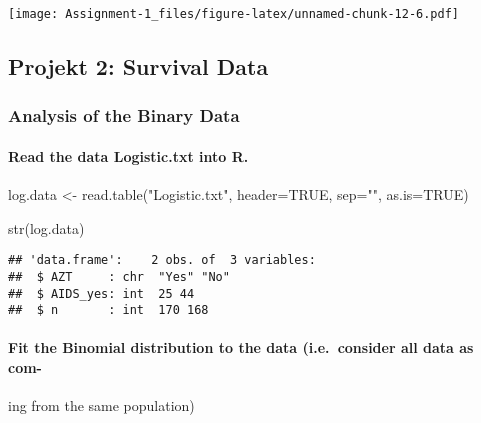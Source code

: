 \documentclass[
]{article}
\newenvironment{Shaded}{\begin{snugshade}}{\end{snugshade}}
\newcommand{\AttributeTok}[1]{\textcolor[rgb]{0.77,0.63,0.00}{#1}}
\newcommand{\CommentTok}[1]{\textcolor[rgb]{0.56,0.35,0.01}{\textit{#1}}}
\newcommand{\ConstantTok}[1]{\textcolor[rgb]{0.00,0.00,0.00}{#1}}
\newcommand{\FloatTok}[1]{\textcolor[rgb]{0.00,0.00,0.81}{#1}}
\newcommand{\FunctionTok}[1]{\textcolor[rgb]{0.00,0.00,0.00}{#1}}
\newcommand{\NormalTok}[1]{#1}
\newcommand{\OtherTok}[1]{\textcolor[rgb]{0.56,0.35,0.01}{#1}}
\newcommand{\SpecialCharTok}[1]{\textcolor[rgb]{0.00,0.00,0.00}{#1}}
\newcommand{\StringTok}[1]{\textcolor[rgb]{0.31,0.60,0.02}{#1}}
\begin{document}
\texttt{[image: Assignment-1\_files/figure-latex/unnamed-chunk-12-6.pdf]}

\hypertarget{projekt-2-survival-data}{%
\subsection{Projekt 2: Survival Data}\label{projekt-2-survival-data}}

\hypertarget{analysis-of-the-binary-data}{%
\subsubsection{Analysis of the Binary
Data}\label{analysis-of-the-binary-data}}

\hypertarget{read-the-data-logistic.txt-into-r.}{%
\paragraph{Read the data Logistic.txt into
R.}\label{read-the-data-logistic.txt-into-r.}}

\begin{Shaded}
\begin{Highlighting}[]
\NormalTok{log.data }\OtherTok{\textless{}{-}} \FunctionTok{read.table}\NormalTok{(}\StringTok{"Logistic.txt"}\NormalTok{, }\AttributeTok{header=}\ConstantTok{TRUE}\NormalTok{, }\AttributeTok{sep=}\StringTok{""}\NormalTok{, }
                       \AttributeTok{as.is=}\ConstantTok{TRUE}\NormalTok{)}

\FunctionTok{str}\NormalTok{(log.data)}
\end{Highlighting}
\end{Shaded}

\begin{verbatim}
## 'data.frame':    2 obs. of  3 variables:
##  $ AZT     : chr  "Yes" "No"
##  $ AIDS_yes: int  25 44
##  $ n       : int  170 168
\end{verbatim}

\hypertarget{fit-the-binomial-distribution-to-the-data-i.e.-consider-all-data-as-com-}{%
\paragraph{Fit the Binomial distribution to the data (i.e.~consider all
data as
com-}\label{fit-the-binomial-distribution-to-the-data-i.e.-consider-all-data-as-com-}}

ing from the same population)

\begin{Shaded}
\end{Shaded}
\end{document}
